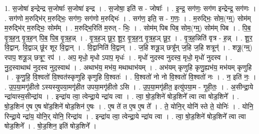 \documentclass[17pt]{extarticle}
\begin{document}
1. स॒जोषा॑ इन्द्रेन्द्र स॒जोषाः᳚ स॒जोषा॑ इन्द्र । . स॒जोषा॒ इति॑ स - जोषाः᳚ । . इ॒न्द्र॒ सग॑णः॒ सग॑ण इन्द्रेन्द्र॒ सग॑णः । . सग॑णो म॒रुद्भि॑र् म॒रुद्भिः॒ सग॑णः॒ सग॑णो म॒रुद्भिः॑ । . सग॑ण॒ इति॒ स - ग॒णः॒ । . म॒रुद्भिः॒ सोम॒(ग्म्॒) सोम॑म् म॒रुद्भि॑र् म॒रुद्भिः॒ सोम᳚म् । . म॒रुद्भि॒रिति॑ म॒रुत् - भिः॒ । . सोम॑म् पिब पिब॒ सोम॒(ग्म्॒) सोम॑म् पिब । . पि॒ब॒ वृ॒त्र॒ह॒न्॒ वृ॒त्र॒ह॒न् पि॒ब॒ पि॒ब॒ वृ॒त्र॒ह॒न्न् । . वृ॒त्र॒ह॒ञ् छू॒र॒ शू॒र॒ वृ॒त्र॒ह॒न्॒ वृ॒त्र॒ह॒ञ् छू॒र॒ । . वृ॒त्र॒ह॒न्निति॑ वृत्र - ह॒न्न् । . शू॒र॒ वि॒द्वान्. वि॒द्वाञ् छू॑र शूर वि॒द्वान् । . वि॒द्वानिति॑ वि॒द्वान् । . ज॒हि शत्रू॒ञ् छत्रू᳚न् ज॒हि ज॒हि शत्रून्॑ । . शत्रू॒(ग्म्॒) रपाप॒ शत्रू॒ञ् छत्रूꣳ॒ रप॑ । . अप॒ मृधो॒ मृधो ऽपाप॒ मृधः॑ । . मृधो॑ नुदस्व नुदस्व॒ मृधो॒ मृधो॑ नुदस्व । . नु॒द॒स्वाथाथ॑ नुदस्व नुद॒स्वाथ॑ । . अथाभ॑य॒ मभ॑य॒ मथाथाभ॑यम् । . अभ॑यम् कृणुहि कृणु॒ह्यभ॑य॒ मभ॑यम् कृणुहि । . कृ॒णु॒हि॒ वि॒श्वतो॑ वि॒श्वत॑स्कृणुहि कृणुहि वि॒श्वतः॑ । . वि॒श्वतो॑ नो नो वि॒श्वतो॑ वि॒श्वतो॑ नः । . न॒ इति॑ नः॒ । . उ॒प॒या॒मगृ॑हीतो ऽस्यस्युपया॒मगृ॑हीत उपया॒मगृ॑हीतो ऽसि । . उ॒प॒या॒मगृ॑हीत॒ इत्यु॑पया॒म - गृ॒ही॒तः॒ । . अ॒सीन्द्रा॒ये न्द्रा॑यास्य॒सीन्द्रा॑य । . इन्द्रा॑य त्वा॒ त्वेन्द्रा॒ये न्द्रा॑य त्वा । . त्वा॒ षो॒ड॒शिने॑ षोड॒शिने᳚ त्वा त्वा षोड॒शिने᳚ । . षो॒ड॒शिन॑ ए॒ष ए॒ष षो॑ड॒शिने॑ षोड॒शिन॑ ए॒षः । . ए॒ष ते॑ त ए॒ष ए॒ष ते᳚ । . ते॒ योनि॒र् योनि॑ स्ते ते॒ योनिः॑ । . योनि॒ रिन्द्रा॒ये न्द्रा॑य॒ योनि॒र् योनि॒ रिन्द्रा॑य । . इन्द्रा॑य त्वा॒ त्वेन्द्रा॒ये न्द्रा॑य त्वा । . त्वा॒ षो॒ड॒शिने॑ षोड॒शिने᳚ त्वा त्वा षोड॒शिने᳚ । . षो॒ड॒शिन॒ इति॑ षोड॒शिने᳚ । \newline
\end{document}
